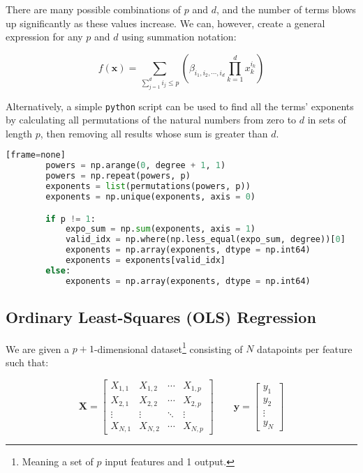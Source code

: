 \documentclass[a4paper,10pt,english]{article}
\begin{document}
	There are many possible combinations of $p$ and $d$, and the number of terms blows up significantly as these values increase.  We can, however, create a general expression \cite{2482654} for any $p$ and $d$ using summation notation:
	
	\begin{equation}
	\label{eq_method_0}
	f(\mathbf{x}) = \sum_{\sum_{j = 1}^d i_j \leq p} \left( \beta_{i_1, i_2, \cdots, i_d} \prod_{k = 1}^d x_k^{i_k} \right)
	\end{equation}
	
	Alternatively, a simple \texttt{python} script can be used to find all the terms' exponents by calculating all permutations of the natural numbers from zero to $d$ in sets of length $p$, then removing all results whose sum is greater than $d$.
	
	\begin{lstlisting}[showstringspaces=false,language=Python,firstnumber = 1][frame=none]
        powers = np.arange(0, degree + 1, 1)
        powers = np.repeat(powers, p)
        exponents = list(permutations(powers, p))
        exponents = np.unique(exponents, axis = 0)

        if p != 1:
            expo_sum = np.sum(exponents, axis = 1)
            valid_idx = np.where(np.less_equal(expo_sum, degree))[0]
            exponents = np.array(exponents, dtype = np.int64)
            exponents = exponents[valid_idx]
        else:
            exponents = np.array(exponents, dtype = np.int64)
	\end{lstlisting}

	\subsection*{Ordinary Least-Squares (OLS) Regression}
	
	We are given a $p+1$-dimensional dataset\footnote{Meaning a set of $p$ input features and 1 output.} consisting of $N$ datapoints per feature such that:
	
	\begin{equation}
	\label{eq_method_1}
	\mathbf{X} = \begin{bmatrix} X_{1,1} & X_{1,2} & \cdots & X_{1,p} \\ X_{2,1} & X_{2,2} & \cdots & X_{2,p} \\ \vdots & \vdots & \ddots & \vdots \\ X_{N,1} & X_{N,2} & \cdots & X_{N,p} \end{bmatrix} \qquad \mathbf{y} = \begin{bmatrix} y_1 \\ y_2 \\ \vdots \\ y_N \end{bmatrix}
	\end{equation}
	
\end{document}
